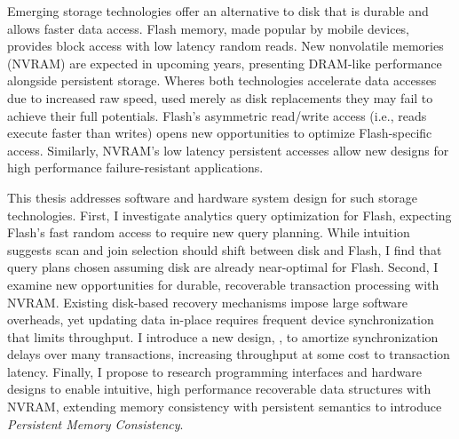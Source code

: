 Emerging storage technologies offer an alternative to disk that is durable and allows faster data access.
Flash memory, made popular by mobile devices, provides block access with low latency random reads.
New nonvolatile memories (NVRAM) are expected in upcoming years, presenting DRAM-like performance alongside persistent storage.
Wheres both technologies accelerate data accesses due to increased raw speed, used merely as disk replacements they may fail to achieve their full potentials.
Flash's asymmetric read/write access (i.e., reads execute faster than writes) opens new opportunities to optimize Flash-specific access.
Similarly, NVRAM's low latency persistent accesses allow new designs for high performance failure-resistant applications.

This thesis addresses software and hardware system design for such storage technologies.
First, I investigate analytics query optimization for Flash, expecting Flash's fast random access to require new query planning.
While intuition suggests scan and join selection should shift between disk and Flash, I find that query plans chosen assuming disk are already near-optimal for Flash.
Second, I examine new opportunities for durable, recoverable transaction processing with NVRAM.
Existing disk-based recovery mechanisms impose large software overheads, yet updating data in-place requires frequent device synchronization that limits throughput.
I introduce a new design, \GroupCommit, to amortize synchronization delays over many transactions, increasing throughput at some cost to transaction latency.
Finally, I propose to research programming interfaces and hardware designs to enable intuitive, high performance recoverable data structures with NVRAM, extending memory consistency with persistent semantics to introduce \emph{Persistent Memory Consistency}.
